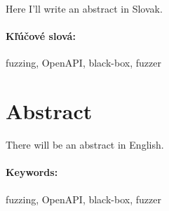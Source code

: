 \documentclass[12pt, twoside]{book}
\begin{document}
Here I'll write an abstract in Slovak.

\paragraph*{Kľúčové slová:} fuzzing, OpenAPI, black-box, fuzzer


\newpage
\section*{Abstract}

There will be an abstract in English.

\paragraph*{Keywords:} fuzzing, OpenAPI, black-box, fuzzer




\newpage

\tableofcontents



\newpage

\listoffigures
\listoftables


\mainmatter












\newpage

\backmatter

\thispagestyle{empty}
\clearpage



\end{document}
